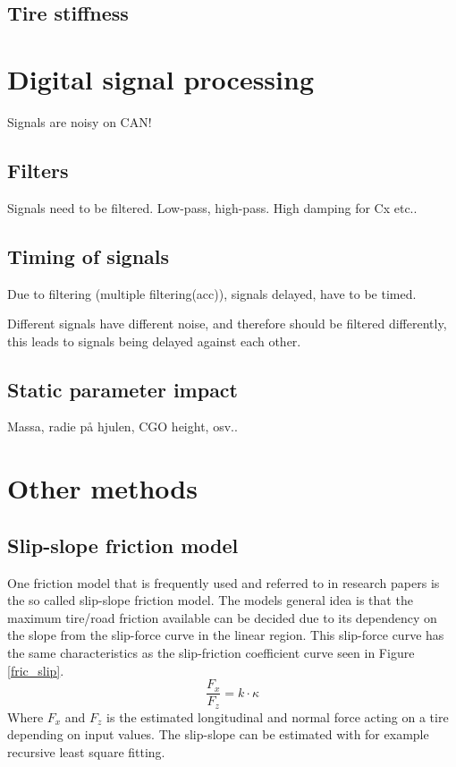 \subsection{Tire stiffness}

\section{Digital signal processing}

Signals are noisy on CAN!

\subsection{Filters}

Signals need to be filtered. Low-pass, high-pass. High damping for Cx etc..

\subsection{Timing of signals}

Due to filtering (multiple filtering(acc)), signals delayed, have to be timed.

Different signals have different noise, and therefore should be filtered differently, this leads to signals being delayed against each other. 

\subsection{Static parameter impact}

Massa, radie på hjulen, CGO height, osv..

\section{Other methods}

\subsection{Slip-slope friction model}

One friction model that is frequently used and referred to in research papers is the so called slip-slope friction model. The models general idea is that the maximum tire/road friction available can be decided due to its dependency on the slope from the slip-force curve in the linear region. This slip-force curve has the same characteristics as the slip-friction coefficient curve seen in Figure \ref{fric_slip}. 
\begin{equation}
\dfrac{F_{x}}{F_{z}} = k \cdot \kappa
\end{equation}
Where $ F_{x} $ and $ F_{z} $ is the estimated longitudinal and normal force acting on a tire depending on input values. The slip-slope can be estimated with for example recursive least square fitting.
